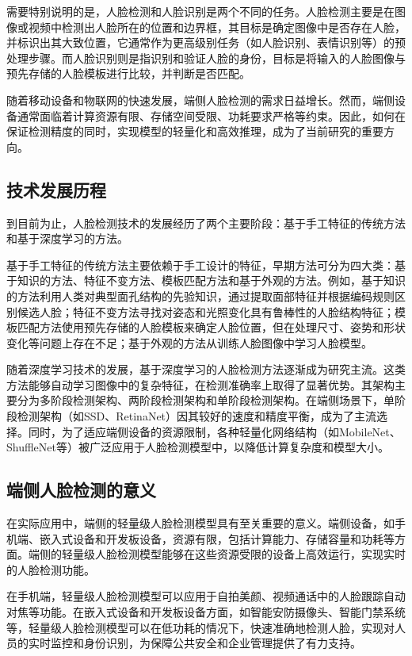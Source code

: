 \documentclass{article}
\begin{document}
需要特别说明的是，人脸检测和人脸识别是两个不同的任务。人脸检测主要是在图像或视频中检测出人脸所在的位置和边界框，其目标是确定图像中是否存在人脸，并标识出其大致位置，它通常作为更高级别任务（如人脸识别、表情识别等）的预处理步骤。而人脸识别则是指识别和验证人脸的身份，目标是将输入的人脸图像与预先存储的人脸模板进行比较，并判断是否匹配。

随着移动设备和物联网的快速发展，端侧人脸检测的需求日益增长。然而，端侧设备通常面临着计算资源有限、存储空间受限、功耗要求严格等约束。因此，如何在保证检测精度的同时，实现模型的轻量化和高效推理，成为了当前研究的重要方向。

\subsection{技术发展历程}
到目前为止，人脸检测技术的发展经历了两个主要阶段：基于手工特征的传统方法和基于深度学习的方法。

基于手工特征的传统方法主要依赖于手工设计的特征，早期方法可分为四大类\cite{yang2002detecting}：基于知识的方法、特征不变方法、模板匹配方法和基于外观的方法。例如，基于知识的方法利用人类对典型面孔结构的先验知识，通过提取面部特征并根据编码规则区别候选人脸；特征不变方法寻找对姿态和光照变化具有鲁棒性的人脸结构特征；模板匹配方法使用预先存储的人脸模板来确定人脸位置，但在处理尺寸、姿势和形状变化等问题上存在不足；基于外观的方法从训练人脸图像中学习人脸模型。

随着深度学习技术的发展，基于深度学习的人脸检测方法逐渐成为研究主流。这类方法能够自动学习图像中的复杂特征，在检测准确率上取得了显著优势。其架构主要分为多阶段检测架构、两阶段检测架构和单阶段检测架构\cite{feng2021detect}。在端侧场景下，单阶段检测架构（如SSD、RetinaNet）因其较好的速度和精度平衡，成为了主流选择。同时，为了适应端侧设备的资源限制，各种轻量化网络结构（如MobileNet、ShuffleNet等）被广泛应用于人脸检测模型中，以降低计算复杂度和模型大小。

\subsection{端侧人脸检测的意义}
在实际应用中，端侧的轻量级人脸检测模型具有至关重要的意义。端侧设备，如手机端、嵌入式设备和开发板设备，资源有限，包括计算能力、存储容量和功耗等方面。端侧的轻量级人脸检测模型能够在这些资源受限的设备上高效运行，实现实时的人脸检测功能。

在手机端，轻量级人脸检测模型可以应用于自拍美颜、视频通话中的人脸跟踪自动对焦等功能。在嵌入式设备和开发板设备方面，如智能安防摄像头、智能门禁系统等，轻量级人脸检测模型可以在低功耗的情况下，快速准确地检测人脸，实现对人员的实时监控和身份识别，为保障公共安全和企业管理提供了有力支持。
\end{document}
